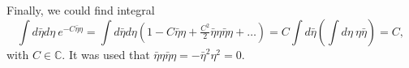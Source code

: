 Finally, we could find integral
\begin{equation*}
	\int d \bar{\eta} d \eta \ e^{- C \bar{\eta} \eta} = 
	\int d \bar{\eta} d \eta \left(
		1 - C \bar{\eta} \eta + \tfrac{C^2}{2} \bar{\eta}  \eta \bar{\eta} \eta + \ldots
	\right) = C \int d \bar{\eta} \left(
		\int d \eta\ \eta \bar{\eta}
	\right) = C,
\end{equation*}
with $C \in \mathbb{C}$. It was used that $\bar{\eta}  \eta \bar{\eta} \eta = - \bar{\eta}^2 \eta^2 = 0$.
